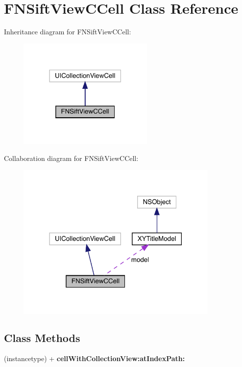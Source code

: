 \hypertarget{interface_f_n_sift_view_c_cell}{}\section{F\+N\+Sift\+View\+C\+Cell Class Reference}
\label{interface_f_n_sift_view_c_cell}


Inheritance diagram for F\+N\+Sift\+View\+C\+Cell\+:\nopagebreak
\begin{figure}[H]
\begin{center}
\leavevmode
\includegraphics[width=189pt]{interface_f_n_sift_view_c_cell__inherit__graph}
\end{center}
\end{figure}


Collaboration diagram for F\+N\+Sift\+View\+C\+Cell\+:\nopagebreak
\begin{figure}[H]
\begin{center}
\leavevmode
\includegraphics[width=282pt]{interface_f_n_sift_view_c_cell__coll__graph}
\end{center}
\end{figure}
\subsection*{Class Methods}
\begin{DoxyCompactItemize}
\item 
\mbox{\label{interface_f_n_sift_view_c_cell_a4423a8b209f2bc272c23c0feabec0785}} 
(instancetype) + {\bfseries cell\+With\+Collection\+View\+:at\+Index\+Path\+:}
\end{DoxyCompactItemize}
